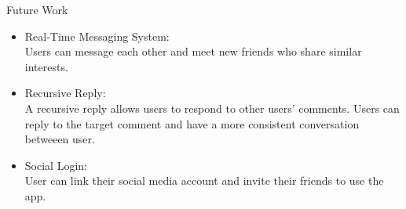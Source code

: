 \begin{block}{Future Work}
\begin{itemize}
\item Real-Time Messaging System:\\
Users can message each other and meet new friends who share similar interests.
\item Recursive Reply:\\
A recursive reply allows users to respond to other users’ comments. Users can reply to the target comment and have a more consistent conversation betweeen user.
\item Social Login:\\
User can link their social media account and invite their friends to use the app.
\end{itemize}
\end{block}